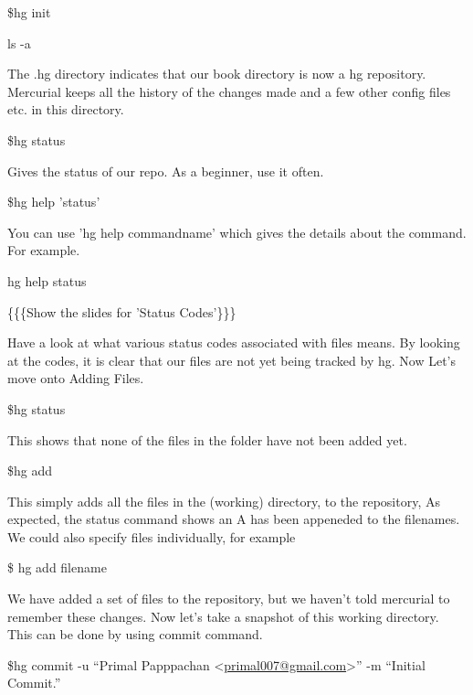 \documentclass[a4paper,english]{article}
\begin{document}
\$hg init

ls -a


The .hg directory indicates that our book directory is now a hg repository. Mercurial keeps all the history of the changes made and a few other config files etc. in this directory.


\$hg status


Gives the status of our repo. As a beginner, use it often.


\$hg help 'status'


You can use 'hg help commandname' which gives the details about the command. For example.


hg help status

\{\{\{Show the slides for 'Status Codes'\}\}\}


Have a look at what various status codes associated with files means. By looking at the codes, it is clear that our files are not yet being tracked by hg. Now Let's move onto Adding Files.


\$hg status


This shows that none of the files in the folder have not been added yet.


\$hg add


This simply adds all the files in the (working) directory, to the repository, As expected, the status command shows an A has been appeneded to the filenames. We could also specify files individually, for example


\$ hg add filename


We have added a set of files to the repository, but we haven't told mercurial to remember these changes. Now let's take a snapshot of this working directory. This can be done by using commit command.


\$hg commit -u ``Primal Papppachan <\href{mailto:primal007@gmail.com}{primal007@gmail.com}>'' -m ``Initial Commit.''
\end{document}
